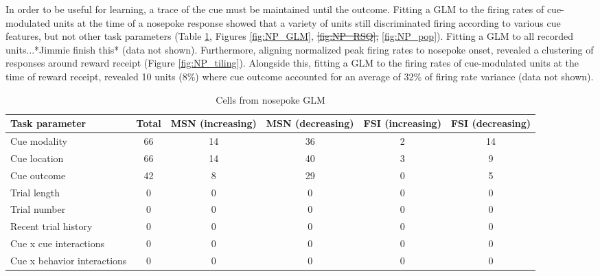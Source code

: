 \documentclass[11pt]{article}
\providecommand{\DIFdel}[1]{{\protect\color{red}\sout{#1}}}                      %
\providecommand{\DIFdelbegin}{} %
\providecommand{\DIFdelend}{} %
\newcommand{\DIFscaledelfig}{0.5}
\newlength{\DIFdelgraphicswidth} %
\newlength{\DIFdelgraphicsheight} %
\newcommand{\DIFdelincludegraphics}[2][]{%
\sbox{\DIFdelgraphicsbox}{\DIFOincludegraphics[#1]{#2}}%
\settoboxwidth{\DIFdelgraphicswidth}{\DIFdelgraphicsbox} %
\settoboxtotalheight{\DIFdelgraphicsheight}{\DIFdelgraphicsbox} %
\scalebox{\DIFscaledelfig}{%
\parbox[b]{\DIFdelgraphicswidth}{\usebox{\DIFdelgraphicsbox}\\[-\baselineskip] \rule{\DIFdelgraphicswidth}{0em}}\llap{\resizebox{\DIFdelgraphicswidth}{\DIFdelgraphicsheight}{%
\setlength{\unitlength}{\DIFdelgraphicswidth}%
\begin{picture}(1,1)%
\thicklines\linethickness{2pt} %
{\color[rgb]{1,0,0}\put(0,0){\framebox(1,1){}}}%
{\color[rgb]{1,0,0}\put(0,0){\line( 1,1){1}}}%
{\color[rgb]{1,0,0}\put(0,1){\line(1,-1){1}}}%
\end{picture}%
}\hspace*{3pt}}} %
} %
\DeclareRobustCommand{\DIFdelbegin}{\DIFOdelbegin \let\includegraphics\DIFdelincludegraphics} %
\DeclareRobustCommand{\DIFdelend}{\DIFOaddend \let\includegraphics\DIFOincludegraphics} %
\begin{document}
In order to be useful for learning, a trace of the cue must be maintained until the outcome. Fitting a GLM to the firing rates of cue-modulated units at the time of a nosepoke response showed that a variety of units still discriminated firing according to various cue features, but not other task parameters (Table \ref{tbl3}, Figures \ref{fig:NP_GLM}, \DIFdelbegin \DIFdel{\ref{fig:NP_RSQ}, }\DIFdelend \ref{fig:NP_pop}). Fitting a GLM to all recorded units...*Jimmie finish this* (data not shown). Furthermore, aligning normalized peak firing rates to nosepoke onset, revealed a clustering of responses around reward receipt (Figure \ref{fig:NP_tiling}). Alongside this, fitting a GLM to the firing rates of cue-modulated units at the time of reward receipt, revealed 10 units (8\%) where cue outcome accounted for an average of 32\% of firing rate variance (data not shown). 


\begin{table}
[p]
\centering
\setlength{\tabcolsep}{1 em} %
\begin{tabular}{l c  c c c c}

Task parameter                                 & Total        & MSN (increasing)        & MSN (decreasing)        &FSI (increasing)        &FSI (decreasing)\\
\hline
Cue modality       & 66         &14          & 36          & 2          &14\\
\hline
Cue location       & 66         &14          & 40          & 3          & 9\\
\hline
Cue outcome       & 42        & 8          & 29        & 0          & 5\\
\hline
Trial length       & 0        & 0         & 0         & 0         & 0\\
\hline
Trial number       & 0         & 0          & 0         & 0          & 0\\
\hline
Recent trial history       & 0         & 0          &0          & 0          & 0\\
\hline
Cue x cue interactions       & 0         &0          & 0          & 0          & 0\\
\hline
Cue x behavior interactions       & 0         & 0          & 0          & 0          & 0\\
\hline

\end{tabular}
\caption {Cells from nosepoke GLM} \label{tbl3} 
\end{table}
\end{document}
